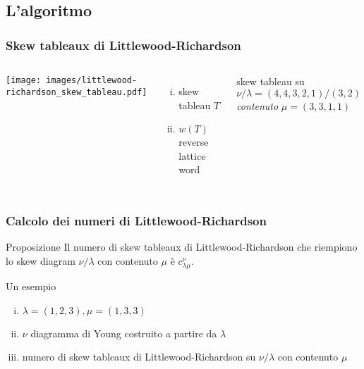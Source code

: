 \documentclass{beamer}
\begin{document}
\subsection{L'algoritmo}

\begin{frame}
\frametitle{Skew tableaux di Littlewood-Richardson}
\begin{columns}[T]
\column{5cm}
\texttt{[image: images/littlewood-richardson\_skew\_tableau.pdf]}
\column{5cm}
\begin{enumerate}[(i)]
\item skew tableau $T$
\item $w(T)$ reverse lattice word
\end{enumerate}
\vspace{1cm}
skew tableau su $\nu / \lambda = (4,4,3,2,1) / (3,2)$\\
\emph{contenuto} $\mu=(3,3,1,1)$
\end{columns}
\end{frame}

\begin{frame}
\frametitle{Calcolo dei numeri di Littlewood-Richardson}
\begin{block}{Proposizione}
Il numero di skew tableaux di Littlewood-Richardson che riempiono lo
skew diagram $\nu/\lambda$ con contenuto $\mu$ \`e $c_{\lambda \mu}^{\nu}$.
\end{block}
\begin{block}{Un esempio}
\begin{enumerate}[(i)]
\item $\lambda=(1,2,3), \mu=(1,3,3)$
\item $\nu$ diagramma di Young costruito a partire da $\lambda$
\item numero di skew tableaux di Littlewood-Richardson su $\nu /
  \lambda$ con contenuto $\mu$
\end{enumerate} 
\end{block}
\end{frame}
\end{document}

